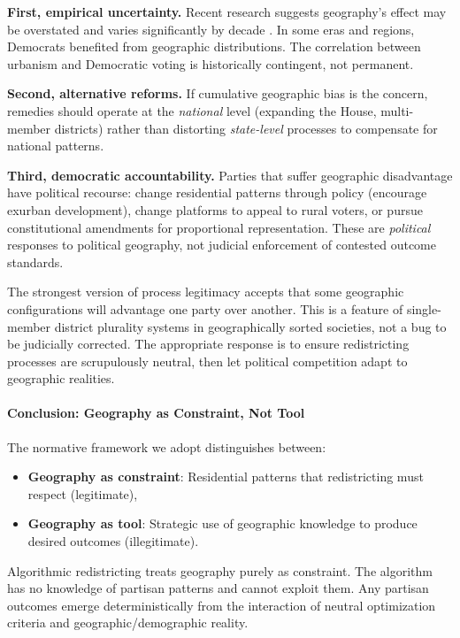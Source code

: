 \textbf{First, empirical uncertainty.} Recent research suggests geography's effect may be overstated and varies significantly by decade \citep{chen2017impact}. In some eras and regions, Democrats benefited from geographic distributions. The correlation between urbanism and Democratic voting is historically contingent, not permanent.

\textbf{Second, alternative reforms.} If cumulative geographic bias is the concern, remedies should operate at the \textit{national} level (expanding the House, multi-member districts) rather than distorting \textit{state-level} processes to compensate for national patterns.

\textbf{Third, democratic accountability.} Parties that suffer geographic disadvantage have political recourse: change residential patterns through policy (encourage exurban development), change platforms to appeal to rural voters, or pursue constitutional amendments for proportional representation. These are \textit{political} responses to political geography, not judicial enforcement of contested outcome standards.

The strongest version of process legitimacy accepts that some geographic configurations will advantage one party over another. This is a feature of single-member district plurality systems in geographically sorted societies, not a bug to be judicially corrected. The appropriate response is to ensure redistricting processes are scrupulously neutral, then let political competition adapt to geographic realities.

\paragraph{Conclusion: Geography as Constraint, Not Tool}

The normative framework we adopt distinguishes between:
\begin{itemize}
\item \textbf{Geography as constraint}: Residential patterns that redistricting must respect (legitimate),
\item \textbf{Geography as tool}: Strategic use of geographic knowledge to produce desired outcomes (illegitimate).
\end{itemize}

Algorithmic redistricting treats geography purely as constraint. The algorithm has no knowledge of partisan patterns and cannot exploit them. Any partisan outcomes emerge deterministically from the interaction of neutral optimization criteria and geographic/demographic reality.

